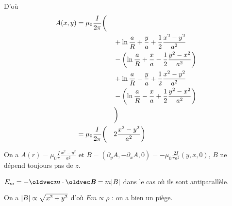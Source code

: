 \begin{solution}
\begin{questions}
    D'où
    \begin{align*}
        A(x,y) &=  \mu_0 \frac{I}{2\pi} \bigg(&& \\
        & &&+      \ln\frac{a}{R} + \frac{y}{a} + \frac12\frac{x^2-y^2}{a^2}\\ 
        & &&- \qty(\ln\frac{a}{R} + \frac{x}{a} - \frac12\frac{y^2-x^2}{a^2}) \\
        & &&+      \ln\frac{a}{R} - \frac{y}{a} + \frac12\frac{x^2-y^2}{a^2} \\
        & &&- \qty(\ln\frac{a}{R} - \frac{x}{a} + \frac12\frac{y^2-x^2}{a^2}) \\
        & &&\bigg)\\
        &=  \mu_0 \frac{I}{2\pi}\bigg(&& 2\frac{x^2-y^2}{a^2} \bigg) 
    \end{align*}
    
    \question On a $A(r) = \mu_0 \frac{I}{\pi}\frac{x^2-y^2}{a^2} $ et $B = (\partial_y A , -\partial_x A , 0) = -\mu_0 \frac{2I}{\pi a^2}(y, x, 0)$, $B$ ne dépend toujours pas de $z$.
    
    \question $E_m = -\vec{m}\cdot \vB = m \abs{B}$ dans le cas où ils sont antiparallèle.
    
    \question On a $\abs{B} \propto \sqrt{x^2 +y^2}$ d'où $Em \propto \rho$ : on a bien un piège.
\end{questions}
\end{solution}
